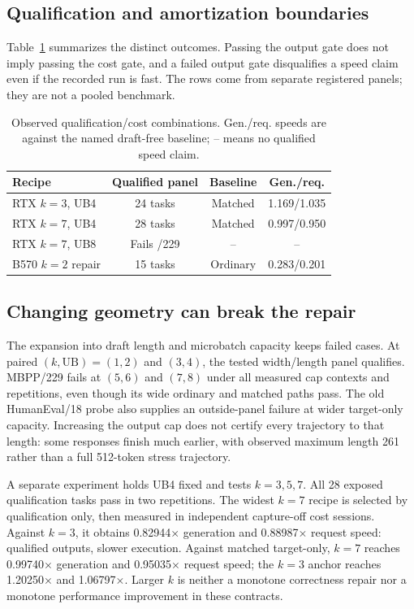 \subsection{Qualification and amortization boundaries}
Table~\ref{tab:boundary} summarizes the distinct outcomes. Passing the output gate does not imply passing the cost gate, and a failed output gate disqualifies a speed claim even if the recorded run is fast. The rows come from separate registered panels; they are not a pooled benchmark.
\begin{table}[t]
\centering\footnotesize\setlength{\tabcolsep}{3pt}
\caption{Observed qualification/cost combinations. Gen./req. speeds are against the named draft-free baseline; -- means no qualified speed claim.}
\label{tab:boundary}
\begin{tabular}{lccc}\toprule
Recipe & Qualified panel & Baseline & Gen./req.\\\midrule
RTX $k=3$, UB4 & 24 tasks & Matched & 1.169/1.035\\
RTX $k=7$, UB4 & 28 tasks & Matched & 0.997/0.950\\
RTX $k=7$, UB8 & Fails /229 & -- & --\\
B570 $k=2$ repair & 15 tasks & Ordinary & 0.283/0.201\\\bottomrule
\end{tabular}\end{table}
\subsection{Changing geometry can break the repair}
The expansion into draft length and microbatch capacity keeps failed cases. At paired $(k,\mathrm{UB})=(1,2)$ and $(3,4)$, the tested width/length panel qualifies. MBPP/229 fails at $(5,6)$ and $(7,8)$ under all measured cap contexts and repetitions, even though its wide ordinary and matched paths pass. The old HumanEval/18 probe also supplies an outside-panel failure at wider target-only capacity. Increasing the output cap does not certify every trajectory to that length: some responses finish much earlier, with observed maximum length 261 rather than a full 512-token stress trajectory.

A separate experiment holds UB4 fixed and tests $k=3,5,7$. All 28 exposed qualification tasks pass in two repetitions. The widest $k=7$ recipe is selected by qualification only, then measured in independent capture-off cost sessions. Against $k=3$, it obtains 0.82944$\times$ generation and 0.88987$\times$ request speed: qualified outputs, slower execution. Against matched target-only, $k=7$ reaches 0.99740$\times$ generation and 0.95035$\times$ request speed; the $k=3$ anchor reaches 1.20250$\times$ and 1.06797$\times$. Larger $k$ is neither a monotone correctness repair nor a monotone performance improvement in these contracts.


